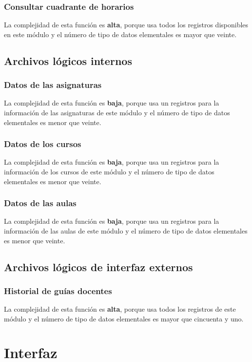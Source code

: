 \documentclass[11pt,a4paper,spanish,twoside]{book}
\begin{document}
\subsubsection{Consultar cuadrante de horarios}
La complejidad de esta función es \textbf{alta}, porque usa todos los
registros disponibles en este módulo y el número de tipo de datos elementales
es mayor que veinte.

\subsection{Archivos lógicos internos}
\subsubsection{Datos de las asignaturas}
La complejidad de esta función es \textbf{baja}, porque usa un
registros para la información de las asignaturas de este módulo y el número
de tipo de datos elementales es menor que veinte.

\subsubsection{Datos de los cursos}
La complejidad de esta función es \textbf{baja}, porque usa un
registros para la información de los cursos de este módulo y el número
de tipo de datos elementales es menor que veinte.

\subsubsection{Datos de las aulas}
La complejidad de esta función es \textbf{baja}, porque usa un
registros para la información de las aulas de este módulo y el número
de tipo de datos elementales es menor que veinte.

\subsection{Archivos lógicos de interfaz externos}
\subsubsection{Historial de guías docentes}
La complejidad de esta función es \textbf{alta}, porque usa todos los
registros de este módulo y el número de tipo de datos elementales es mayor
que cincuenta y uno. 

\section{Interfaz}
\end{document}
